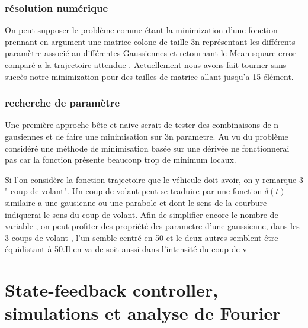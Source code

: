 \documentclass[11pt,a4paper]{article}
\begin{document}
\subsubsection{résolution numérique}
On peut supposer le problème comme étant la minimization d'une fonction prennant en argument une matrice colone de taille 3n représentant les différents paramètre associé au différentes Gaussiennes et retournant le Mean square error comparé a la trajectoire attendue .
Actuellement nous avons fait tourner sans succès notre minimization pour des tailles de matrice allant jusqu'a 15 élément.
\subsubsection{recherche de paramètre}


Une première approche bête et naive serait de tester des combinaisons de n gausiennes  et de faire une minimisation sur 3n parametre.
Au vu du problème considéré une méthode de minimisation basée sur une dérivée ne fonctionnerai pas car la fonction présente beaucoup trop de minimum locaux.

Si l'on considère la fonction trajectoire que le véhicule doit avoir, on y remarque 3 " coup de volant". Un coup de volant peut se traduire par une fonction $\delta(t) $
similaire a une gausienne ou une parabole et dont le sens de la courbure indiquerai le sens du coup de volant.
Afin de simplifier encore le nombre de variable , on peut profiter des propriété des parametre d'une gaussienne, dans les 3 coups de volant , l'un semble centré en 50 et le deux autres semblent être équidistant à 50.Il en va de soit aussi dans l'intensité du coup de v 

\section{State-feedback controller, simulations et analyse de Fourier}
\subsection{}
\end{document}
